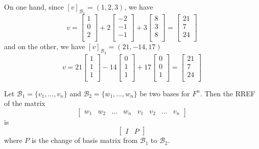 \documentclass{article}
\begin{document}
\begin{example}
  On one hand, since $[v]_{\mathcal{B}_1} = (1, 2, 3)$, we have \[
    v =
    \begin{bmatrix}
      1\\0\\2\\
    \end{bmatrix} + 2
    \begin{bmatrix}
      -2\\-1\\-1\\
    \end{bmatrix} + 3
    \begin{bmatrix}
      8\\3\\8\\
    \end{bmatrix} =
    \begin{bmatrix}
      21\\7\\24\\
    \end{bmatrix}
  \] and on the other, we have $[v]_{\mathcal{B}_2} = (21, -14, 17)$ \[
    v = 21
    \begin{bmatrix}
      1\\1\\1\\
    \end{bmatrix} -14
    \begin{bmatrix}
      0\\1\\1\\
    \end{bmatrix} + 17
    \begin{bmatrix}
      0\\0\\1\\
    \end{bmatrix} =
    \begin{bmatrix}
      21\\7\\24\\
    \end{bmatrix}
  \]
\end{example}
\begin{theorem}
  Let $\mathcal{B}_1 = \{v_1, \ldots, v_n\}$ and $\mathcal{B}_2 = \{w_1, \ldots, w_n\}$ be two bases for $F^n$. Then the RREF of the matrix \[
    \left[
      \begin{array}{cccc|cccc}
        w_1 & w_2 & \dots & w_n & v_1 & v_2 & \dots & v_n
    \end{array}\right]
  \] is \[
    \left[
      \begin{array}{c|c}
        I & P
    \end{array}\right]
  \]
  where $P$ is the change of basis matrix from $\mathcal{B}_1$ to $\mathcal{B}_2$.
\end{theorem}
\end{document}
